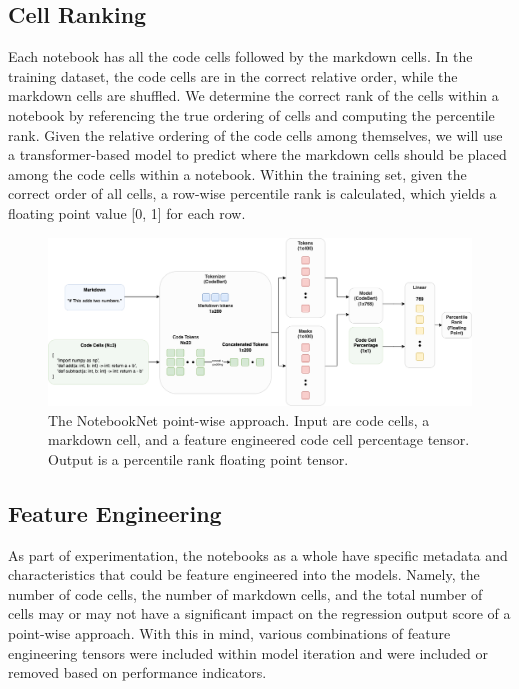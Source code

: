\documentclass[conference]{IEEEtran}
\begin{document}
\subsection{Cell Ranking}
Each notebook has all the code cells followed by the markdown cells. In the training dataset, the code cells are in the correct relative order, while the markdown cells are shuffled. We determine the correct rank of the cells within a notebook by referencing the true ordering of cells and computing the percentile rank. Given the relative ordering of the code cells among themselves, we will use a transformer-based model to predict where the markdown cells should be placed among the code cells within a notebook. Within the training set, given the correct order of all cells, a row-wise percentile rank is calculated, which yields a floating point value [0, 1] for each row.

\begin{figure}
  \centering
  \includegraphics[width=\textwidth]{baseline}
  \caption{The NotebookNet point-wise approach. Input are code cells, a markdown cell, and a feature engineered code cell percentage tensor. Output is a percentile rank floating point tensor.}
\end{figure}

\subsection{Feature Engineering}
As part of experimentation, the notebooks as a whole have specific metadata and characteristics that could be feature engineered into the models. Namely, the number of code cells, the number of markdown cells, and the total number of cells may or may not have a significant impact on the regression output score of a point-wise approach. With this in mind, various combinations of feature engineering tensors were included within model iteration and were included or removed based on performance indicators.
\end{document}
